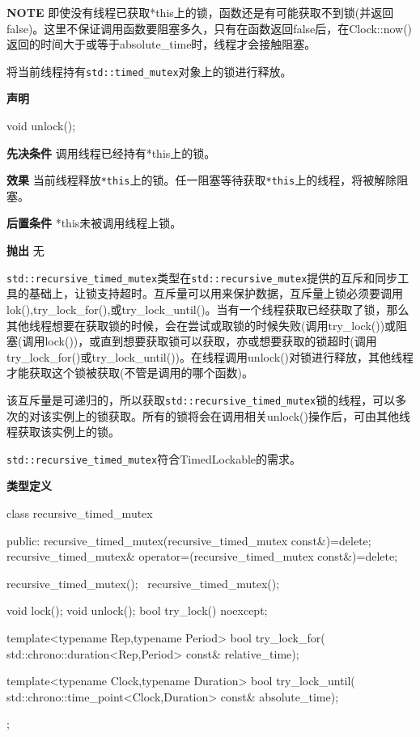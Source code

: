 \textbf{NOTE} 即使没有线程已获取*this上的锁，函数还是有可能获取不到锁(并返回false)。这里不保证调用函数要阻塞多久，只有在函数返回false后，在Clock::now()返回的时间大于或等于absolute\_time时，线程才会接触阻塞。


将当前线程持有\texttt{std::timed\_mutex}对象上的锁进行释放。

\textbf{声明}

\begin{cpp}
void unlock();
\end{cpp}

\textbf{先决条件}
调用线程已经持有*this上的锁。

\textbf{效果}
当前线程释放\texttt{*this}上的锁。任一阻塞等待获取\texttt{*this}上的线程，将被解除阻塞。

\textbf{后置条件}
*this未被调用线程上锁。

\textbf{抛出}
无


\texttt{std::recursive\_timed\_mutex}类型在\texttt{std::recursive\_mutex}提供的互斥和同步工具的基础上，让锁支持超时。互斥量可以用来保护数据，互斥量上锁必须要调用lok(),try\_lock\_for(),或try\_lock\_until()。当有一个线程获取已经获取了锁，那么其他线程想要在获取锁的时候，会在尝试或取锁的时候失败(调用try\_lock())或阻塞(调用lock())，或直到想要获取锁可以获取，亦或想要获取的锁超时(调用try\_lock\_for()或try\_lock\_until())。在线程调用unlock()对锁进行释放，其他线程才能获取这个锁被获取(不管是调用的哪个函数)。

该互斥量是可递归的，所以获取\texttt{std::recursive\_timed\_mutex}锁的线程，可以多次的对该实例上的锁获取。所有的锁将会在调用相关unlock()操作后，可由其他线程获取该实例上的锁。

\texttt{std::recursive\_timed\_mutex}符合TimedLockable的需求。

\textbf{类型定义}

\begin{cpp}
class recursive_timed_mutex
{
public:
  recursive_timed_mutex(recursive_timed_mutex const&)=delete;
  recursive_timed_mutex& operator=(recursive_timed_mutex const&)=delete;

  recursive_timed_mutex();
  ~recursive_timed_mutex();

  void lock();
  void unlock();
  bool try_lock() noexcept;

  template<typename Rep,typename Period>
  bool try_lock_for(
      std::chrono::duration<Rep,Period> const& relative_time);

  template<typename Clock,typename Duration>
  bool try_lock_until(
      std::chrono::time_point<Clock,Duration> const& absolute_time);
};
\end{cpp}


